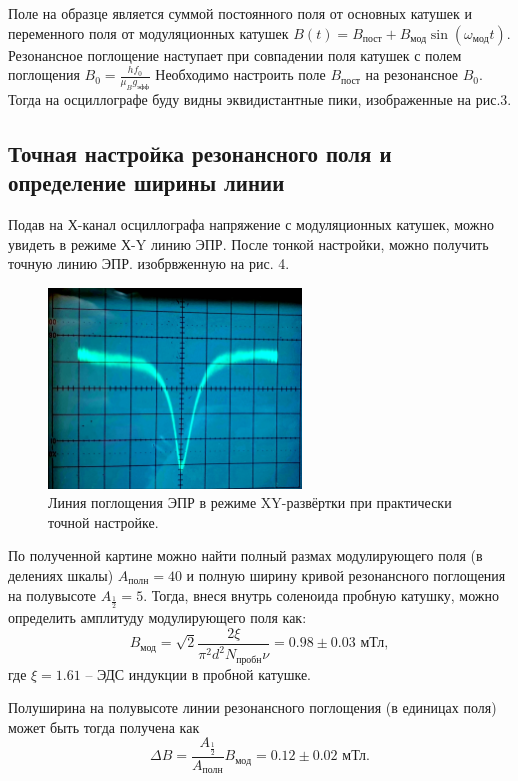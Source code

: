 \documentclass[a4paper, 14pt]{extarticle}%
\newcommand\ECaption[1]{%
     \captionsetup{font=footnotesize}%
     \caption{#1}}
\begin{document}
Поле на образце является суммой постоянного поля от основных катушек и переменного
поля от модуляционных катушек 
$B(t) = B_{\text{пост}} + B_{\text{мод}}\sin (\omega_{\text{мод}}t)$. Резонансное поглощение наступает при совпадении поля катушек с полем поглощения $B_0 = \frac{hf_0}{\mu_B g_{\text{эфф}}}$ Необходимо настроить поле $B_{\text{пост}}$ на резонансное $B_0$. Тогда на осциллографе буду видны эквидистантные пики, изображенные на рис.3.

\subsection*{Точная настройка резонансного поля и определение ширины линии}

Подав на Х-канал осциллографа напряжение с модуляционных катушек, можно увидеть в режиме Х-Y линию ЭПР. После тонкой настройки, можно получить точную линию ЭПР. изобрвженную на рис. 4.

\begin{figure}[h]
\begin{center}
\includegraphics[width=0.6\textwidth]{epr}
\end{center}
\ECaption{Линия поглощения ЭПР в режиме XY-развёртки при практически точной настройке.}
\end{figure}

По полученной картине можно найти  полный размах
модулирующего поля (в делениях шкалы) $A_{\text{полн}} = 40$ и полную ширину кривой резонансного
поглощения на полувысоте $A_{\frac{1}{2}} = 5$. Тогда, внеся внутрь соленоида пробную катушку, можно определить амплитуду модулирующего поля как:
\[B_{\text{мод}} = \sqrt{2} \frac{2\xi}{\pi^2 d^2 N_{\text{пробн}} \nu}   =  0.98\pm0.03 \text{ мТл},\]
где $\xi = 1.61$ -- ЭДС индукции в пробной катушке. 

Полуширина на полувысоте линии резонансного
поглощения (в единицах поля) может быть тогда получена как
\[\Delta B = \frac{A_{\frac{1}{2}}}{A_{\text{полн}}}B_{мод} = 0.12\pm0.02\text{ мТл}.\]
\end{document}
